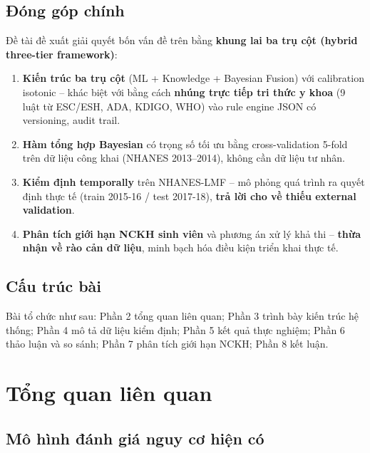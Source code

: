 \documentclass[13pt,a4paper]{article}
\begin{document}
\subsection{Đóng góp chính}

Đề tài đề xuất giải quyết bốn vấn đề trên bằng \textbf{khung lai ba trụ cột (hybrid three-tier framework)}:

\begin{enumerate}
    \item \textbf{Kiến trúc ba trụ cột} (ML + Knowledge + Bayesian Fusion) với calibration isotonic -- khác biệt với \cite{kraljevic2024,shmatko2025} bằng cách \textbf{nhúng trực tiếp tri thức y khoa} (9 luật từ ESC/ESH, ADA, KDIGO, WHO) vào rule engine JSON có versioning, audit trail.
    \item \textbf{Hàm tổng hợp Bayesian} có trọng số tối ưu bằng cross-validation 5-fold trên dữ liệu công khai (NHANES 2013--2014), không cần dữ liệu tư nhân.
    \item \textbf{Kiểm định temporally} trên NHANES-LMF -- mô phỏng quá trình ra quyết định thực tế (train 2015-16 / test 2017-18), \textbf{trả lời cho \cite{swinckels2024} về thiếu external validation}.
    \item \textbf{Phân tích giới hạn NCKH sinh viên} và phương án xử lý khả thi -- \textbf{thừa nhận \cite{guo2024,shen2025} về rào cản dữ liệu}, minh bạch hóa điều kiện triển khai thực tế.
\end{enumerate}

\subsection{Cấu trúc bài}

Bài tổ chức như sau: Phần 2 tổng quan liên quan; Phần 3 trình bày kiến trúc hệ thống; Phần 4 mô tả dữ liệu kiểm định; Phần 5 kết quả thực nghiệm; Phần 6 thảo luận và so sánh; Phần 7 phân tích giới hạn NCKH; Phần 8 kết luận.

\section{Tổng quan liên quan}

\subsection{Mô hình đánh giá nguy cơ hiện có}
\end{document}
